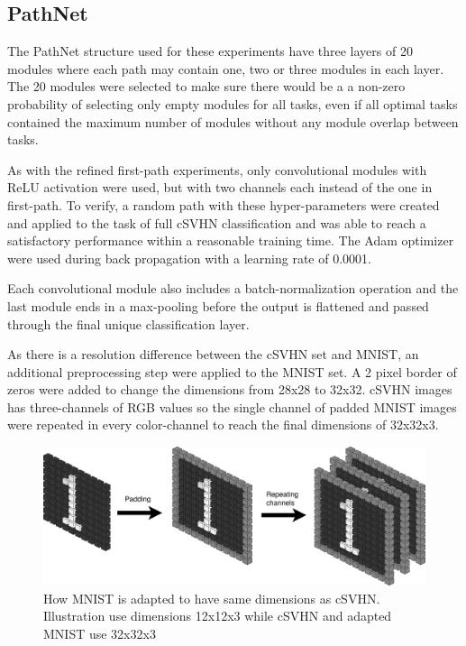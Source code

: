 \subsection{PathNet}
The PathNet structure used for these experiments have three layers of 20 modules where each path may contain one, two or three modules in each layer. The 20 modules were selected to make sure there would be a a non-zero probability of selecting only empty modules for all tasks, even if all optimal tasks contained the maximum number of modules without any module overlap between tasks.

As with the refined first-path experiments, only convolutional modules with ReLU activation were used, but with two channels each instead of the one in first-path. To verify, a random path with these hyper-parameters were created and applied to the task of full cSVHN classification and was able to reach a satisfactory performance within a reasonable training time. The Adam optimizer were used during back propagation with a learning rate of 0.0001. 

Each convolutional module also includes a batch-normalization operation and the last module ends in a max-pooling before the output is flattened and passed through the final unique classification layer. 

As there is a resolution difference between the cSVHN set and MNIST, an additional preprocessing step were applied to the MNIST set. A 2 pixel border of zeros were added to change the dimensions from 28x28 to 32x32. cSVHN images has three-channels of RGB values so the single channel of padded MNIST images were repeated in every color-channel to reach the final dimensions of 32x32x3.  

\begin{figure}[h]
    \includegraphics[width=\textwidth]{Chapters/Experiments/search_algo/figures/MNISTpadding+repeating.png}
    \caption{How MNIST is adapted to have same dimensions as cSVHN. Illustration use dimensions 12x12x3 while cSVHN and adapted MNIST use 32x32x3}
    \label{fig:MNISTpadding}
\end{figure}

